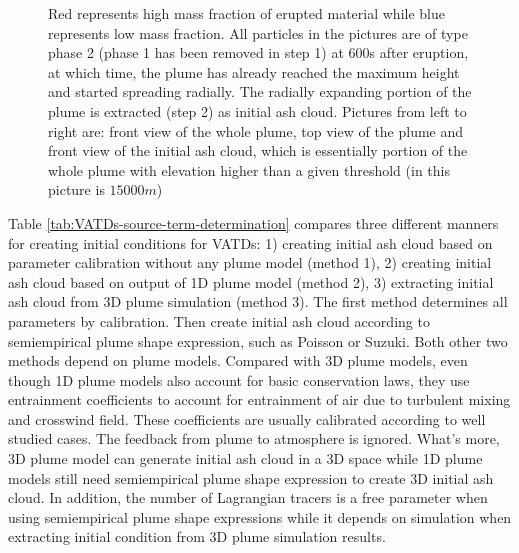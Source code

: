 \begin{figure}[!htb]
\begin{minipage}{.325 \textwidth}
    \end{minipage}%
    \caption{Red represents high mass fraction of erupted material while blue represents low mass fraction. All particles in the pictures are of type phase 2 (phase 1 has been removed in step 1) at 600s after eruption, at which time, the plume has already reached the maximum height and started spreading radially. The radially expanding portion of the plume is extracted (step 2) as initial ash cloud. Pictures from left to right are: front view of the whole plume, top view of the plume and front view of the initial ash cloud, which is essentially portion of the whole plume with elevation higher than a given threshold (in this picture is $15000 m$)}
    \label{fig:Plume-SPH-Pinatubo-ash-cloud}
\end{figure}

Table \ref{tab:VATDs-source-term-determination} compares three different manners for creating initial conditions for VATDs: 1) creating initial ash cloud based on parameter calibration without any plume model (method 1), 2) creating initial ash cloud based on output of 1D plume model (method 2), 3) extracting initial ash cloud from 3D plume simulation (method 3). The first method determines all parameters by calibration. Then create initial ash cloud according to semiempirical plume shape expression, such as Poisson or Suzuki. Both other two methods depend on plume models. Compared with 3D plume models, even though 1D plume models also account for basic conservation laws, they use entrainment coefficients to account for entrainment of air due to turbulent mixing and crosswind field. These coefficients are usually calibrated according to well studied cases. The feedback from plume to atmosphere is ignored. What's more, 3D plume model can generate initial ash cloud in a 3D space while 1D plume models still need semiempirical plume shape expression to create 3D initial ash cloud. In addition, the number of Lagrangian tracers is a free parameter when using semiempirical plume shape expressions while it depends on simulation when extracting initial condition from 3D plume simulation results.


